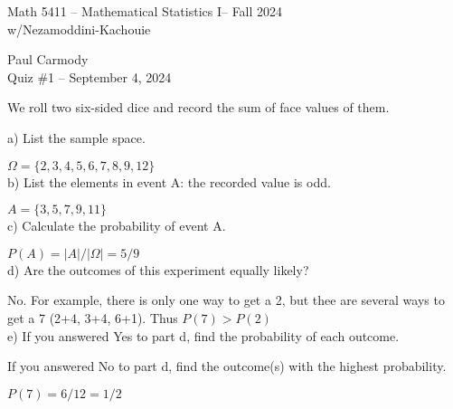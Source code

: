 \documentclass[10pt,a4paper]{report}
\newcommand{\CLASSNAME}{Math 5411 -- Mathematical Statistics I}
\newcommand{\PROFESSOR}{Nezamoddini-Kachouie}
\newcommand{\STUDENTNAME}{Paul Carmody}
\newcommand{\ASSIGNMENT}{Quiz \#1 }
\newcommand{\DUEDATE}{September 4, 2024}
\newcommand{\SEMESTER}{Fall 2024}
\begin{document}
\begin{center}
	\Large{\CLASSNAME -- \SEMESTER} \\
	\large{w/\PROFESSOR}
\end{center}
\begin{center}
	\STUDENTNAME \\
	\ASSIGNMENT -- \DUEDATE\\
\end{center}
We roll two six-sided dice and record the sum of face values of them. 

a) List the sample space.

$\Omega = \{ 2,3,4,5,6,7,8,9,12\}$\\

b) List the elements in event A: the recorded value is odd.

$A = \{ 3,5,7,9,11\}$\\

c) Calculate the probability of event A.

$P(A) = |A|/|\Omega| = 5/9$\\

d) Are the outcomes of this experiment equally likely? 

No.  For example, there is only one way to get a 2, but thee are several ways to get a 7 (2+4, 3+4, 6+1).  Thus $P(7) > P(2)$\\

e) If you answered Yes to part d, find the probability of each outcome.

    If you answered No to part d, find the outcome(s) with the highest probability.   
    
$P(7) = 6/12 = 1/2$\\
\end{document}
